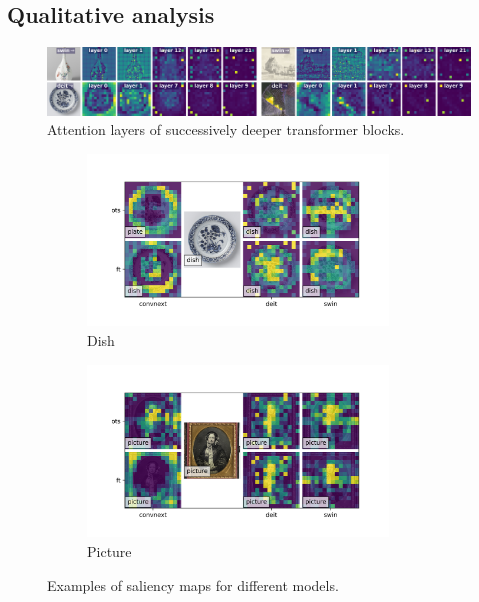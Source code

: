 \subsection{Qualitative analysis}

\begin{figure}[tb]
    \includegraphics[width=\textwidth]{img/layers.png}
    \caption{Attention layers of successively deeper transformer blocks.}
    \label{results:img:layers}
\end{figure}

\begin{figure}[tb]
    \centering
    \begin{subfigure}{0.49\textwidth}
    \includegraphics[width=8cm]{img/img005_salience.png}
    \caption{Dish}
    \label{results:img:sal:dish}
    \end{subfigure}
    \begin{subfigure}{0.49\textwidth}
    \includegraphics[width=8cm]{img/img011_salience.png}
    \caption{Picture}
    \label{results:img:sal:dish}
    \end{subfigure}
    \caption{Examples of saliency maps for different models.}
\end{figure}
